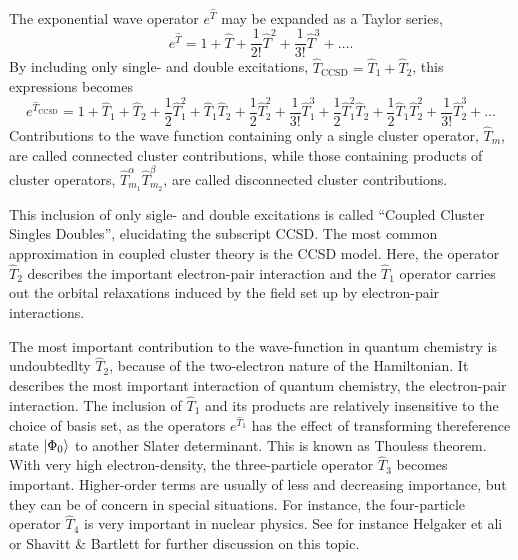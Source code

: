 The exponential wave operator $e^{\hat{T}}$ may be expanded as a Taylor series,
\begin{equation}
    e^{\hat{T}} = 1 + \hat{T} + \frac{1}{2!}\hat{T}^2
        + \frac{1}{3!}\hat{T}^3 + \dots.
\end{equation}
By including only single- and double excitations, 
$\hat{T}_{\text{CCSD}} = \hat{T}_1 + \hat{T}_2$,
this expressions becomes
\begin{equation}
    e^{\hat{T}_{\text{CCSD}}} = 
        1 + \hat{T}_1 + \hat{T}_2 
        + \frac{1}{2}\hat{T}_1^2 + \hat{T}_1\hat{T}_2 + \frac{1}{2} \hat{T}_2^2
        + \frac{1}{3!}\hat{T}_1^3 + \frac{1}{2}\hat{T}_1^2 \hat{T}_2
            + \frac{1}{2}\hat{T}_1\hat{T}_2^2 + \frac{1}{3!}\hat{T}_2^3 
        + \dots
\end{equation}
Contributions to the wave function containing only a single cluster operator, $\hat{T}_m$,
are called connected cluster contributions, while those containing products of cluster 
operators, $\hat{T}_{m_1}^{\alpha}\hat{T}_{m_2}^{\beta}$, are called disconnected
cluster contributions.

This inclusion of only sigle- and double excitations is called ``Coupled Cluster Singles 
Doubles'', elucidating the subscript CCSD\cite{purvis1982full}.
The most common approximation in coupled cluster theory is the CCSD model. Here, 
the operator $\hat{T}_2$ describes the important electron-pair interaction and the 
$\hat{T}_1$ operator carries out the orbital relaxations induced by the field set 
up by electron-pair interactions. 

\begin{tcolorbox}[title={Importance of different parts of the cluster operator}, 
    colback={white},
    colbacktitle={pink},
    coltitle={black}]
    The most important contribution to the wave-function in quantum chemistry is
    undoubtedlty $\hat{T}_2$, because 
    of the two-electron nature of the Hamiltonian. It describes the most important 
    interaction of quantum chemistry, the electron-pair interaction. The inclusion 
    of $\hat{T}_1$ and its products are relatively insensitive to the choice of 
    basis set, as the operators $e^{\hat{T}_1}$ has the effect of transforming 
    thereference state $\ket{\Phi_0}$ to another Slater determinant. This is known 
    as Thouless theorem\cite{thouless1960stability}. With very high electron-density,
    the three-particle operator $\hat{T}_3$ becomes important. Higher-order terms 
    are usually of less and decreasing importance, but they can be of concern in 
    special situations. For instance, the four-particle operator $\hat{T}_4$ is 
    very important in nuclear physics. See for instance Helgaker et 
    ali\cite{helgaker2014molecular} or 
    Shavitt \& Bartlett\cite{shavitt2009many} for further discussion on this topic.
\end{tcolorbox}


